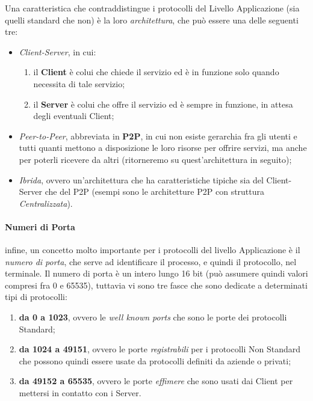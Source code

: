 \documentclass[a4paper]{article}
\begin{document}
		Una caratteristica che contraddistingue i protocolli del Livello Applicazione (sia quelli standard che non) è la loro \emph{architettura}, che può essere una delle seguenti tre:
		\begin{itemize}
			\item \emph{Client-Server}, in cui:
				\begin{enumerate}
					\item il \textbf{Client} è colui che chiede il servizio ed è in funzione solo quando necessita di tale servizio;
					\item il \textbf{Server} è colui che offre il servizio ed è sempre in funzione, in attesa degli eventuali Client;
				\end{enumerate}
			\item \emph{Peer-to-Peer}, abbreviata in \textbf{P2P}, in cui non esiste gerarchia fra gli utenti e tutti quanti mettono a disposizione le loro risorse per offrire servizi, ma anche per poterli ricevere da altri (ritorneremo su quest'architettura in seguito);
			\item \emph{Ibrida}, ovvero un'architettura che ha caratteristiche tipiche sia del Client-Server che del P2P (esempi sono le architetture P2P con struttura \emph{Centralizzata}).
		\end{itemize}
		
		
		\paragraph{Numeri di Porta}
		\label{par:porta}	
			infine, un concetto molto importante per i protocolli del livello Applicazione è il \emph{numero di porta}, che serve ad identificare il processo, 	e quindi il protocollo, nel terminale. Il numero di porta è un intero lungo 16 bit (può assumere quindi valori compresi fra 0 e 65535), tuttavia vi sono tre fasce che sono dedicate a determinati tipi di protocolli:
			\begin{enumerate}
				\item \textbf{da 0 a 1023}, ovvero le \emph{well known ports} che sono le porte dei protocolli Standard;
				\item \textbf{da 1024 a 49151}, ovvero le porte \emph{registrabili} per i protocolli Non Standard che possono quindi essere usate da protocolli definiti da aziende o privati;
				\item \textbf{da 49152 a 65535}, ovvero le porte \emph{effimere} che sono usati dai Client per mettersi in contatto con i Server.
			\end{enumerate}
	
\end{document}
